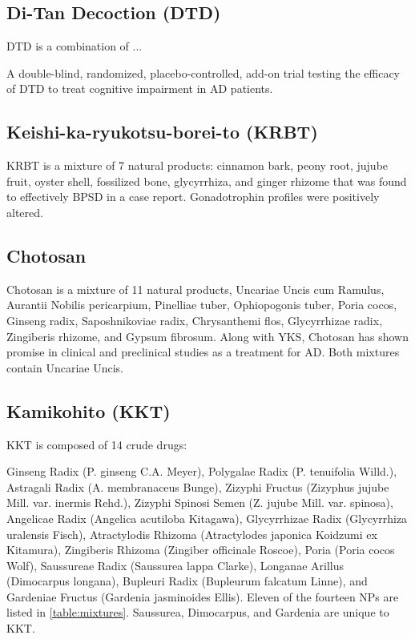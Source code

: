 \documentclass[twocolumn]{article}
\begin{document}
\subsection{Di-Tan Decoction (DTD)}
DTD is a combination of ...

A double-blind, randomized, placebo-controlled, add-on trial
testing the efficacy of DTD to treat cognitive impairment
in AD patients.
\cite{chua2015efficacy}



\subsection{Keishi-ka-ryukotsu-borei-to (KRBT)}

KRBT is a mixture of 7 natural products:
cinnamon bark,
peony root,
jujube fruit,
oyster shell,
fossilized bone,
glycyrrhiza,
and ginger rhizome
that was found to effectively BPSD in a case report.
Gonadotrophin profiles were positively altered.
\cite{niitsu2013behavioural}




\subsection{Chotosan}
Chotosan is a mixture of 11 natural products,
Uncariae Uncis cum Ramulus,
Aurantii Nobilis pericarpium,
Pinelliae tuber,
Ophiopogonis tuber,
Poria cocos,
Ginseng radix,
Saposhnikoviae radix,
Chrysanthemi flos,
Glycyrrhizae radix,
Zingiberis rhizome,
and Gypsum fibrosum.
Along with YKS, Chotosan has shown promise in clinical and
preclinical studies as a treatment for AD.
Both mixtures contain Uncariae Uncis.
\cite{matsumoto2013kampo}



\subsection{Kamikohito (KKT)}
KKT is composed of 14 crude drugs:

Ginseng Radix (P. ginseng C.A. Meyer),
Polygalae Radix (P. tenuifolia Willd.),
Astragali Radix (A. membranaceus Bunge),
Zizyphi Fructus (Zizyphus jujube Mill. var. inermis Rehd.),
Zizyphi Spinosi Semen (Z. jujube Mill. var. spinosa),
Angelicae Radix (Angelica acutiloba Kitagawa),
Glycyrrhizae Radix (Glycyrrhiza uralensis Fisch),
Atractylodis Rhizoma (Atractylodes japonica Koidzumi ex Kitamura),
Zingiberis Rhizoma (Zingiber officinale Roscoe),
Poria (Poria cocos Wolf),
Saussureae Radix (Saussurea lappa Clarke),
Longanae Arillus (Dimocarpus longana),
Bupleuri Radix (Bupleurum falcatum Linne), and
Gardeniae Fructus (Gardenia jasminoides Ellis).
Eleven of the fourteen NPs are listed in \ref{table:mixtures}.
Saussurea, Dimocarpus, and Gardenia are unique to KKT.
\end{document}
